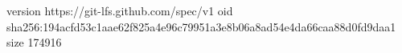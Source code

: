 version https://git-lfs.github.com/spec/v1
oid sha256:194acfd53c1aae62f825a4e96c79951a3e8b06a8ad54e4da66caa88d0fd9daa1
size 174916
